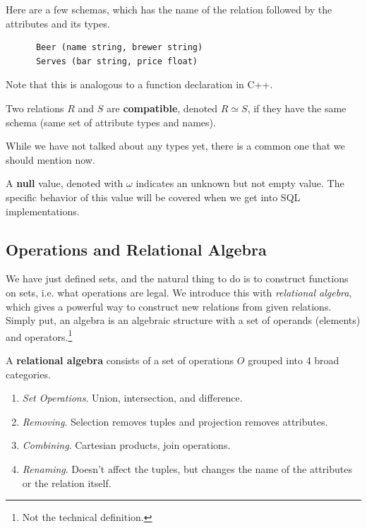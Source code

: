   \begin{example}[Schemas]
    Here are a few schemas, which has the name of the relation followed by the attributes and its types. 
    \begin{lstlisting}
      Beer (name string, brewer string)
      Serves (bar string, price float)
    \end{lstlisting}
    Note that this is analogous to a function declaration in C++. 
  \end{example}  

  \begin{definition}[Compatiblity]
    Two relations $R$ and $S$ are \textbf{compatible}, denoted $R \simeq S$, if they have the same schema (same set of attribute types and names). 
  \end{definition}

  While we have not talked about any types yet, there is a common one that we should mention now. 

  \begin{definition}[Null]
    A \textbf{null} value, denoted with $\omega$ indicates an unknown but not empty value. The specific behavior of this value will be covered when we get into SQL implementations. 
  \end{definition}

\subsection{Operations and Relational Algebra}

    We have just defined sets, and the natural thing to do is to construct functions on sets, i.e. what operations are legal. We introduce this with \textit{relational algebra}, which gives a powerful way to construct new relations from given relations. Simply put, an algebra is an algebraic structure with a set of operands (elements) and operators.\footnote{Not the technical definition.}

    \begin{definition} 
      A \textbf{relational algebra} consists of a set of operations $O$ grouped into 4 broad categories. 
      \begin{enumerate}
        \item \textit{Set Operations}. Union, intersection, and difference. 
        \item \textit{Removing}. Selection removes tuples and projection removes attributes. 
        \item \textit{Combining}. Cartesian products, join operations. 
        \item \textit{Renaming}. Doesn't affect the tuples, but changes the name of the attributes or the relation itself. 
      \end{enumerate}
    \end{definition}

